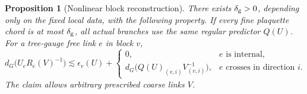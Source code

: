 \documentclass[11pt,reqno]{amsart}
\numberwithin{equation}{section}
\newtheorem{proposition}[theorem]{Proposition}
\theoremstyle{definition}
\theoremstyle{remark}
\begin{document}
\begin{proposition}[Nonlinear block reconstruction]
\label{prop:tail-chart-entry}
There exists \(\delta_{\rm g}>0\), depending only on the fixed
local data, with the following property. If every fine plaquette chord is at most
\(\delta_{\rm g}\), all actual branches use the same regular
predictor \(Q(U)\). For a tree-gauge free link \(e\) in block
\(v\),
\begin{equation}
 d_G\bigl(U_eR_e(V)^{-1}\bigr)
       \lesssim\epsilon_v(U)
       +\begin{cases}
           0,&e\text{ is internal},\\
           d_G\bigl(Q(U)_{(v,i)}V_{(v,i)}^{-1}\bigr),
                                      &e\text{ crosses in direction }i.
         \end{cases}
 \label{eq:tail-nonlinear-reconstruction}
\end{equation}
The claim allows arbitrary prescribed coarse links \(V\).
\end{proposition}
\end{document}
